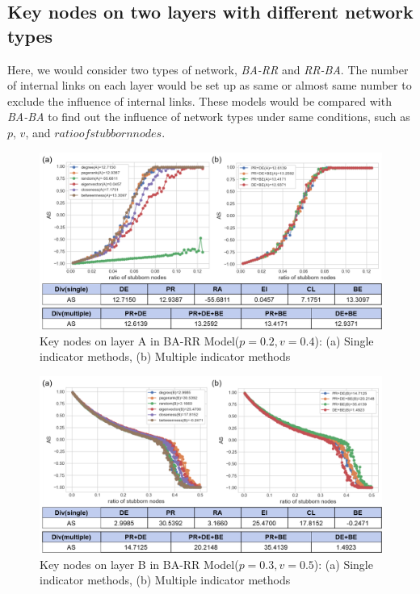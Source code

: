 \subsection{Key nodes on two layers with different network types}
Here, we would consider two types of network, \textit{BA-RR} and \textit{RR-BA}. The number of internal links on each layer would be set up as same or almost same number to exclude the influence of internal links. These models would be compared with \textit{BA-BA} to find out the influence of network types under same conditions, such as $p$, $v$, and $ratio of stubborn nodes$.  
\begin{figure}[!htb]
	\centering
	\includegraphics[width=\hsize]{figure/chap5_keynode_BA_RR_A.png}
	\caption{Key nodes on layer A in BA-RR Model($p=0.2, v=0.4$):
		(a) Single indicator methods, (b) Multiple indicator methods}
	\label{chap5_keynode_BA_RR_A}
\end{figure}
\begin{figure}[!htb]
	\centering
	\includegraphics[width=\hsize]{figure/chap5_keynode_BA_RR_B.png}
	\caption{Key nodes on layer B in BA-RR Model($p=0.3, v=0.5$):
		(a) Single indicator methods, (b) Multiple indicator methods}
	\label{chap5_keynode_BA_RR_B}
\end{figure}
